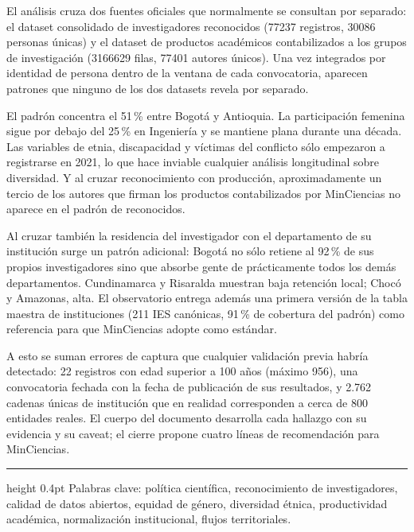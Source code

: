 \documentclass[11pt,a4paper,oneside]{article}
\begin{document}
El análisis cruza dos fuentes oficiales que normalmente se consultan por separado: el dataset consolidado de investigadores reconocidos (\num{77237} registros, \num{30086} personas únicas) y el dataset de productos académicos contabilizados a los grupos de investigación (\num{3166629} filas, \num{77401} autores únicos). Una vez integrados por identidad de persona dentro de la ventana de cada convocatoria, aparecen patrones que ninguno de los dos datasets revela por separado.

El padrón concentra el 51\,\% entre Bogotá y Antioquia. La participación femenina sigue por debajo del 25\,\% en Ingeniería y se mantiene plana durante una década. Las variables de etnia, discapacidad y víctimas del conflicto sólo empezaron a registrarse en 2021, lo que hace inviable cualquier análisis longitudinal sobre diversidad. Y al cruzar reconocimiento con producción, aproximadamente un tercio de los autores que firman los productos contabilizados por MinCiencias no aparece en el padrón de reconocidos.

Al cruzar también la residencia del investigador con el departamento de su institución surge un patrón adicional: Bogotá no sólo retiene al 92\,\% de sus propios investigadores sino que absorbe gente de prácticamente todos los demás departamentos. Cundinamarca y Risaralda muestran baja retención local; Chocó y Amazonas, alta. El observatorio entrega además una primera versión de la tabla maestra de instituciones (211 IES canónicas, 91\,\% de cobertura del padrón) como referencia para que MinCiencias adopte como estándar.

A esto se suman errores de captura que cualquier validación previa habría detectado: 22 registros con edad superior a 100 años (máximo 956), una convocatoria fechada con la fecha de publicación de sus resultados, y 2.762 cadenas únicas de institución que en realidad corresponden a cerca de 800 entidades reales. El cuerpo del documento desarrolla cada hallazgo con su evidencia y su caveat; el cierre propone cuatro líneas de recomendación para MinCiencias.

\bigskip
\hrule height 0.4pt
\vspace{0.3em}
\noindent\footnotesize\color{rule} Palabras clave: política científica, reconocimiento de investigadores, calidad de datos abiertos, equidad de género, diversidad étnica, productividad académica, normalización institucional, flujos territoriales.

\newpage

\hypersetup{linkcolor=black}
\renewcommand{\contentsname}{\color{usta}\Large Tabla de contenidos}
\tableofcontents
\hypersetup{linkcolor=usta}
\newpage
\end{document}
